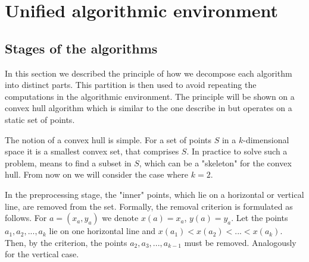 \documentclass[a4paper,english,numberwithinsect,notab]{eurocg20-submission}
\begin{document}


\section{Unified algorithmic environment}
\label{sec:unified-algorithmic-environment}
\subsection{Stages of the algorithms}


	
	
	In this section we described the principle of how we decompose each algorithm into distinct parts. This partition is then used to avoid repeating the computations in the algorithmic environment. The principle will be shown on a convex hull algorithm which is similar to the one describe in \cite{overmars} but operates on a static set of points.
	
	The notion of a convex hull is simple. For a set of points $S$ in a $k$-dimensional space it is a smallest convex set, that comprises $S$. In practice to solve such a problem, means to find a subset in $S$, which can be a "skeleton" for the convex hull. From now on we will consider the case where $k=2$.
	
	
	
	
	In the preprocessing stage, the "inner" points, which lie on a horizontal or vertical line, are removed from the set. Formally, the removal criterion is formulated as follows. For $a = (x_a, y_a)$ we denote $x(a)=x_a$, $y(a)=y_a$. Let the points $a_1, a_2, ..., a_k$ lie on one horizontal line and $x(a_1) < x(a_2) <... <x (a_k) $. Then, by the criterion, the points $a_2, a_3, ..., a_{k-1}$ must be removed. Analogously for the vertical case.
	
\end{document}

